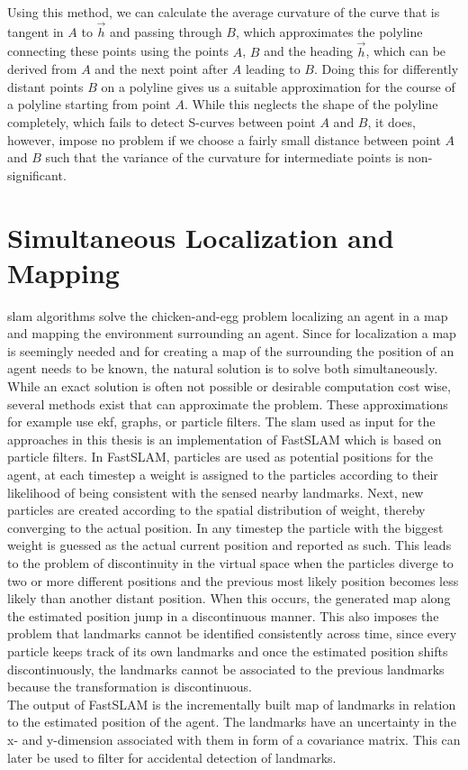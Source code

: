 Using this method, we can calculate the average curvature of the curve that is tangent in $A$ to $\vec h$ and passing through $B$, which approximates the polyline connecting these points using the points $A$, $B$ and the heading  $\vec h$, which can be derived from $A$ and the next point after $A$ leading to $B$.
Doing this for differently distant points $B$ on a polyline gives us a suitable approximation for the course of a polyline starting from point $A$. While this neglects the shape of the polyline completely, which fails to detect S-curves between point $A$ and $B$, it does, however, impose no problem if we choose a fairly small distance between point $A$ and $B$ such that the variance of the curvature for intermediate points is non-significant.
\section{Simultaneous Localization and Mapping}
\ac{slam} algorithms solve the chicken-and-egg problem localizing an agent in a map and mapping the environment surrounding an agent. Since for localization a map is seemingly needed and for creating a map of the surrounding the position of an agent needs to be known, the natural solution is to solve both simultaneously. While an exact solution is often not possible  or desirable computation cost wise, several methods exist that can approximate the problem. These approximations for example use \ac{ekf}, graphs, or particle filters. The \ac{slam} used as input for the approaches in this thesis is an implementation of FastSLAM \cite{FastSLAM2002} which is based on particle filters. In FastSLAM, particles are used as potential positions for the agent, at each timestep a weight is assigned to the particles according to their likelihood of being consistent with the sensed nearby landmarks. Next, new particles are created according to the spatial distribution of weight, thereby converging to the actual position. In any timestep the particle with the biggest weight is guessed as the actual current position and reported as such. This leads to the problem of  discontinuity in the virtual space when the particles diverge to two or more different positions and the previous most likely position becomes less likely than another distant position. When this occurs, the generated map along the estimated position jump in a discontinuous manner. This also imposes the problem that landmarks cannot be identified consistently across time, since every particle keeps track of its own landmarks and once the estimated position shifts discontinuously, the landmarks cannot be associated to the previous landmarks because the transformation is discontinuous. \\The output of FastSLAM is the incrementally built map of landmarks in relation to the estimated position of the agent. The landmarks have an uncertainty in the x- and y-dimension associated with them in form of a covariance matrix. This can later be used to filter for accidental detection of landmarks.

